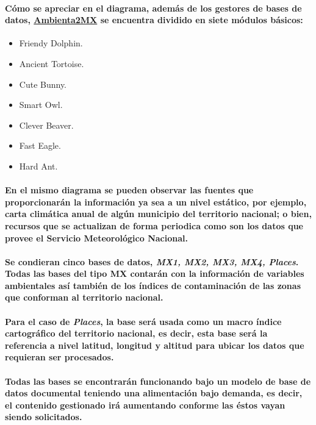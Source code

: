     \paragraph{Cómo se apreciar en el diagrama, además de los gestores de bases de datos, \underline{Ambienta2MX} se encuentra dividido en siete módulos básicos:}
    \begin{itemize}
    \item Friendy Dolphin.
    \item Ancient Tortoise.
    \item Cute Bunny.
    \item Smart Owl.
    \item Clever Beaver.
    \item Fast Eagle.
    \item Hard Ant.
  \end{itemize}
    \paragraph{En el mismo diagrama se pueden observar las fuentes que proporcionarán la información ya sea a un nivel estático, por ejemplo, carta climática anual de algún municipio del territorio nacional; o bien, recursos que se actualizan de forma periodica como son los datos que provee el Servicio Meteorológico Nacional.}
    \paragraph{Se condieran cinco bases de datos, \emph{MX1, MX2, MX3, MX4, Places}. Todas las bases del tipo MX contarán con la información de variables ambientales así también de los índices de contaminación de las zonas que conforman al territorio nacional.}
    \paragraph{Para el caso de \emph{Places}, la base será usada como un macro índice cartográfico del territorio nacional, es decir, esta base será la referencia a nivel latitud, longitud y altitud para ubicar los datos que requieran ser procesados.}
    \paragraph{Todas las bases se encontrarán funcionando bajo un modelo de base de datos documental teniendo una alimentación bajo demanda, es decir, el contenido gestionado irá aumentando conforme las éstos vayan siendo solicitados.}
